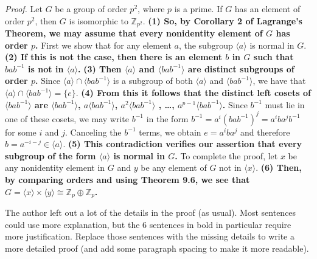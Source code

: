 \documentclass{article}
\newcommand{\ZZ}{\mathbb{Z}}
\newcommand{\inv}{^{-1}}
\newcommand{\iso}{\cong}
\begin{document}
\begin{enumerate}
{    \textit{Proof.}
    Let $G$ be a group of order $p^2$, where $p$ is a prime. If $G$ has an element of order $p^2$, then $G$ is isomorphic to $\ZZ_{p^2}$.
    \textbf{(1) So, by Corollary 2 of Lagrange’s Theorem, we may assume that every nonidentity element of $G$ has order $p$. }
    First we show that for any element $a$, the subgroup $\langle a\rangle$ is normal in $G$. 
    \textbf{(2) If this is not the case, then there is an element $b$ in $G$ such that $bab\inv$ is not in $\langle a\rangle$.}
    \textbf{(3) Then $\langle a\rangle$ and $\langle bab\inv\rangle$ are distinct subgroups of order $p$.}
    Since $\langle a\rangle\cap\langle bab\inv\rangle$ is a subgroup of both $\langle a\rangle$ and $\langle bab\inv\rangle$, we have that $\langle a\rangle\cap\langle bab\inv\rangle=\{e\}$. 
    \textbf{(4) From this it follows that the distinct left cosets of $\langle bab\inv\rangle$ are $\langle bab\inv\rangle$, $a\langle bab\inv\rangle$, $a^2\langle bab\inv\rangle$ , \dots, $a^{p-1}\langle bab\inv\rangle$.} 
    Since $b\inv$ must lie in one of these cosets, we may write $b\inv$ in the form $b\inv=a^i(bab\inv)^j=a^iba^jb\inv$ for some $i$ and $j$. 
    Canceling the $b\inv$ terms, we obtain $e=a^iba^j$ and therefore $b=a^{-i-j}\in\langle a\rangle$. 
    \textbf{(5) This contradiction verifies our assertion that every subgroup of the form $\langle a\rangle$ is normal in $G$. }
    To complete the proof, let $x$ be any nonidentity element in $G$ and $y$ be any element of $G$ not in $\langle x\rangle$.
    \textbf{(6) Then, by comparing orders and using Theorem 9.6, we see that $G=\langle x\rangle\times\langle y\rangle\iso \ZZ_p\oplus\ZZ_p$.}
    }
    \bigskip
    
    The author left out a lot of the details in the proof (as usual).  Most sentences could use more explanation, but the 6 sentences in bold in particular require more justification. Replace those sentences with the missing details to write a more detailed proof (and add some paragraph spacing to make it more readable).
    
    
\end{enumerate}
\end{document}
